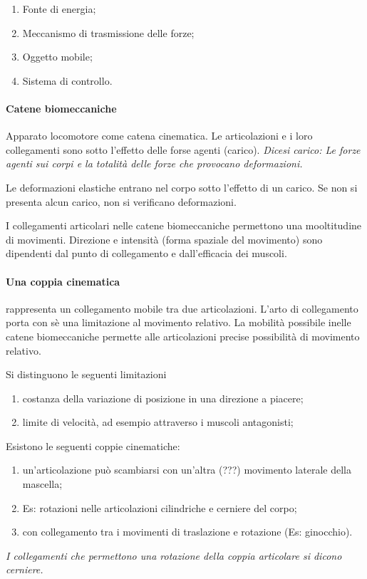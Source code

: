 \begin {enumerate}
	\item Fonte di energia;
	\item Meccanismo di trasmissione delle forze;
	\item Oggetto mobile;
	\item Sistema di controllo.
\end {enumerate}

\paragraph {Catene biomeccaniche}
Apparato locomotore come catena cinematica.
Le articolazioni e i loro collegamenti sono sotto l'effetto delle forse agenti (carico).
\textit {Dicesi \emph {carico}: Le forze agenti sui corpi e la totalit\`a delle forze che provocano deformazioni.}

\par {Le deformazioni elastiche} entrano nel corpo sotto l'effetto di un carico.
Se non si presenta alcun carico, non si verificano deformazioni.

\par {I collegamenti articolari} nelle catene biomeccaniche
permettono una mooltitudine di movimenti.
Direzione e intensit\`a (forma spaziale del movimento) sono dipendenti
dal punto di collegamento e dall'efficacia dei muscoli.

\paragraph {Una coppia cinematica} rappresenta un collegamento mobile tra due articolazioni.
L'arto di collegamento porta con s\`e una limitazione al movimento relativo.
La mobilit\`a possibile inelle catene biomeccaniche permette alle articolazioni
precise possibilit\`a di movimento relativo.

Si distinguono le seguenti limitazioni
\begin {enumerate}
	\item [Geometrica] costanza della variazione di posizione in una direzione a piacere;
	\item [Cinematica] limite di velocit\`a, ad esempio attraverso i muscoli antagonisti;
\end {enumerate}

Esistono le seguenti coppie cinematiche:
\begin  {enumerate}
	\item [Progressiva] un'articolazione pu\`o scambiarsi con un'altra (???) movimento laterale della mascella;
	\item [Coppia di rotazione] Es: rotazioni nelle articolazioni cilindriche e cerniere del corpo;
	\item [Coppia a vite ???] con collegamento tra i movimenti di traslazione e rotazione (Es: ginocchio).
\end  {enumerate}
\textit {I collegamenti che permettono una rotazione della coppia articolare si dicono \emph {cerniere}.}

